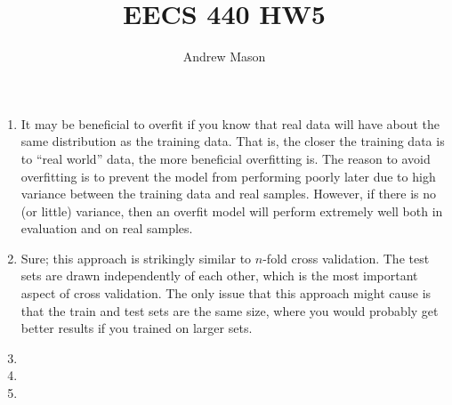 \documentclass[12pt]{article}
\title{EECS 440 HW5}
\author{Andrew Mason}
\begin{document}
\maketitle

\begin{enumerate}
  \item
    It may be beneficial to overfit if you know that real data will have about
    the same distribution as the training data. That is, the closer the
    training data is to ``real world'' data, the more beneficial overfitting
    is. The reason to avoid overfitting is to prevent the model from performing
    poorly later due to high variance between the training data and real
    samples. However, if there is no (or little) variance, then an overfit
    model will perform extremely well both in evaluation and on real samples.\\
  \item
    Sure; this approach is strikingly similar to $n$-fold cross validation. The
    test sets are drawn independently of each other, which is the most important
    aspect of cross validation. The only issue that this approach might cause is
    that the train and test sets are the same size, where you would probably get
    better results if you trained on larger sets.\\
  \item
  \item
  \item
\end{enumerate}
\end{document}
